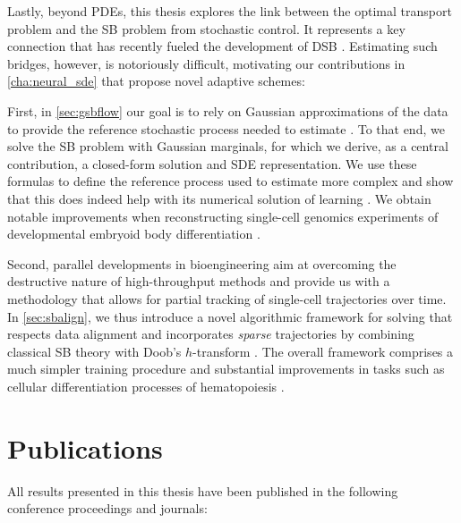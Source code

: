 Lastly, beyond PDEs, this thesis explores the link between the optimal transport problem and the \acrfull{SB} problem from stochastic control. It represents a key connection that has recently fueled the development of \acrfull{DSB} \citep{de2021diffusion, chen2021stochastic, liu2022deep, bunne2022recovering}. Estimating such bridges, however, is notoriously difficult, motivating our contributions in \cref{cha:neural_sde} that propose novel adaptive schemes:

First, in \cref{sec:gsbflow} our goal is to rely on Gaussian approximations of the data to provide the reference stochastic process needed to estimate . To that end, we solve the \acrlong{SB} problem with Gaussian marginals, for which we derive, as a central contribution, a closed-form solution and SDE representation. We use these formulas to define the reference process used to estimate more complex  and show that this does indeed help with its numerical solution of learning . We obtain notable improvements when reconstructing single-cell genomics experiments of developmental embryoid body differentiation \citep{bunne2022recovering}.

Second, parallel developments in bioengineering aim at overcoming the destructive nature of high-throughput methods and provide us with a methodology that allows for partial tracking of single-cell trajectories over time.
In \cref{sec:sbalign}, we thus introduce a novel algorithmic framework for solving  that respects data alignment and incorporates \emph{sparse} trajectories by combining classical \acrlong{SB} theory with Doob's 
$h$-transform \citep{somnath2023aligned}. The overall framework comprises a much simpler training procedure and substantial improvements in tasks such as cellular differentiation processes of hematopoiesis \citep{weinreb2020lineage}.



\newpage
\section{Publications}
All results presented in this thesis have been published in the following conference proceedings and journals:

